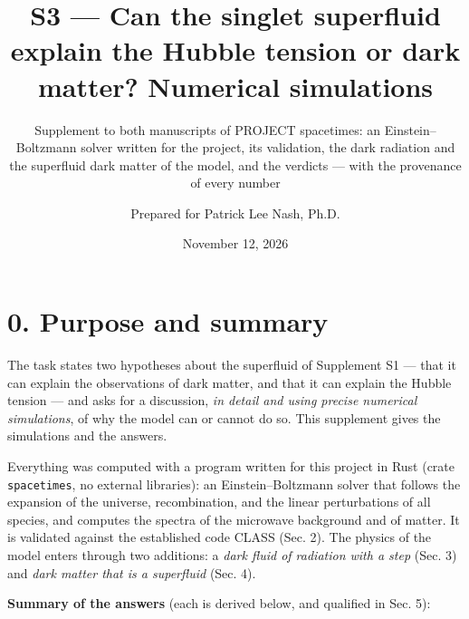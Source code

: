 \documentclass[
  10pt,
]{article}
\title{S3 --- Can the singlet superfluid explain the Hubble tension or
dark matter? Numerical simulations}
\subtitle{Supplement to both manuscripts of PROJECT spacetimes: an
Einstein--Boltzmann solver written for the project, its validation, the
dark radiation and the superfluid dark matter of the model, and the
verdicts --- with the provenance of every number}
\author{Prepared for Patrick Lee Nash, Ph.D.}
\date{November 12, 2026}
\begin{document}
\maketitle

\hypertarget{purpose-and-summary}{%
\section{0. Purpose and summary}\label{purpose-and-summary}}

The task states two hypotheses about the superfluid of Supplement S1 ---
that it can explain the observations of dark matter, and that it can
explain the Hubble tension --- and asks for a discussion, \emph{in
detail and using precise numerical simulations}, of why the model can or
cannot do so. This supplement gives the simulations and the answers.

Everything was computed with a program written for this project in Rust
(crate \texttt{spacetimes}, no external libraries): an
Einstein--Boltzmann solver that follows the expansion of the universe,
recombination, and the linear perturbations of all species, and computes
the spectra of the microwave background and of matter. It is validated
against the established code CLASS (Sec. 2). The physics of the model
enters through two additions: a \emph{dark fluid of radiation with a
step} (Sec. 3) and \emph{dark matter that is a superfluid} (Sec. 4).

\textbf{Summary of the answers} (each is derived below, and qualified in
Sec. 5):
\end{document}
